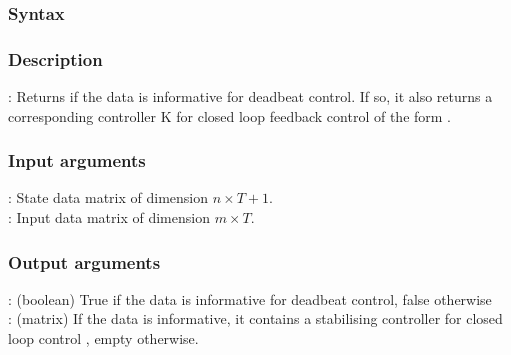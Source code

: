 \subsubsection*{Syntax}

\subsubsection*{Description}
: Returns if the data is informative for deadbeat control. If so, it also returns a corresponding controller K for closed loop feedback control of the form .

\subsubsection*{Input arguments}
\textbf{}: State data matrix of dimension $n \times T+1$.\\
\textbf{}: Input data matrix of dimension $m \times T$.

\subsubsection*{Output arguments}
\textbf{}: (boolean) True if the data is informative for deadbeat control, false otherwise\\
\textbf{}: (matrix) If the data is informative, it contains a stabilising controller  for closed loop control , empty otherwise.

